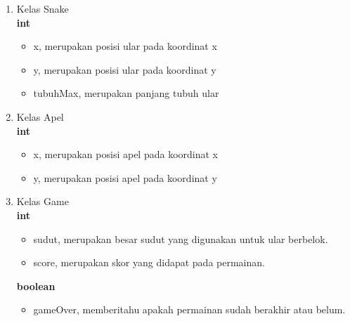 \begin{enumerate}
	\item Kelas Snake\\
\textbf{int}

\begin{itemize}
	\item x, merupakan posisi ular pada koordinat x
	\item y, merupakan posisi ular pada koordinat y
	\item tubuhMax, merupakan panjang tubuh ular
\end{itemize}

	\item Kelas Apel\\
	\textbf{int}
	
\begin{itemize}
	\item x, merupakan posisi apel pada koordinat x
	\item y, merupakan posisi apel pada koordinat y
\end{itemize}

\item Kelas Game \\
\textbf{int}

\begin{itemize}
	\item sudut, merupakan besar sudut yang digunakan untuk ular berbelok.
	\item score, merupakan skor yang didapat pada permainan.
\end{itemize}

\textbf{boolean}
\begin{itemize}
	\item gameOver, memberitahu apakah permainan sudah berakhir atau belum.
\end{itemize}

\end{enumerate}
